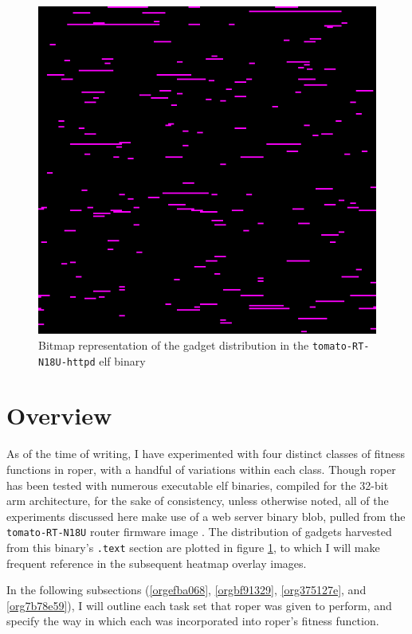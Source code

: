\documentclass[12pt,glossary]{dalthesis}
\begin{document}
\begin{figure}[htbp]
\centering
\includegraphics[width=.9\linewidth]{../images/tomato-RT-N18U-httpd_heatmap.png}
\caption{\label{fig:org69bdba2}
Bitmap representation of the gadget distribution in the \texttt{tomato-RT-N18U-httpd} \gls{elf} binary}
\end{figure}

\section{Overview}
\label{sec:orgd7d92e5}
\label{org65eb74a}

As of the time of writing, I have experimented with four distinct classes of
fitness functions in \gls{roper}, with a handful of variations within each class.
Though \gls{roper} has been tested with numerous executable \gls{elf} binaries,
compiled for the 32-bit \gls{arm} architecture, for the sake of consistency, 
unless otherwise noted, all of the experiments discussed here make use of
a web server binary blob, pulled from the \texttt{tomato-RT-N18U} router firmware
image \cite{tomato-RT-N18U}. The distribution of gadgets harvested from this
binary's \texttt{.text} section are plotted in figure \ref{fig:org69bdba2}, to which
I will make frequent reference in the subsequent heatmap overlay images.

In the following subsections (\ref{orgefba068}, \ref{orgbf91329},
\ref{org375127e}, and \ref{org7b78e59}), I will outline each task set that
\gls{roper} was given to perform, and specify the way in which each was
incorporated into \gls{roper}'s fitness function.
\end{document}
